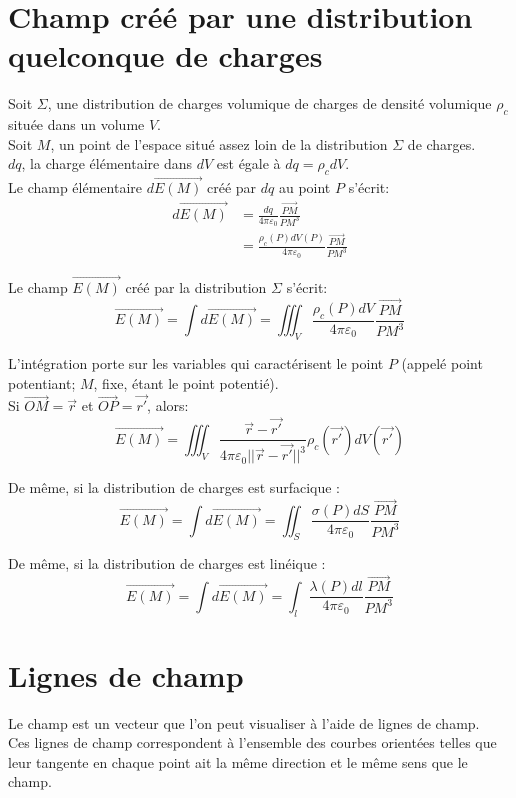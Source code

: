 \documentclass[../main.tex]{subfile}
\begin{document}
\section{Champ créé par une distribution quelconque de charges}
Soit $\Sigma$, une distribution de charges volumique de charges de densité volumique $\rho_c$ située dans un volume $V$.\\
Soit $M$, un point de l'espace situé assez loin de la distribution $\Sigma$ de charges.\\
$dq$, la charge élémentaire dans $dV$ est égale à $dq = \rho_cdV$.\\
Le champ élémentaire $d\vec{E(M)}$ créé par $dq$ au point $P$ s'écrit:
$$
\begin{aligned}
	d\vec{E(M)} &= \frac{dq}{4\pi\varepsilon_0} \frac{\vec{PM}}{PM^3}\\
	&= \frac{\rho_c(P) dV(P)}{4\pi\varepsilon_0}\frac{\vec{PM}}{PM^3}
\end{aligned}
$$

Le champ $\vec{E(M)}$ créé par la distribution $\Sigma$ s'écrit:
$$\vec{E(M)} = \int d\vec{E(M)} = \iiint_V \frac{\rho_c(P)dV}{4\pi\varepsilon_0} \frac{\vec{PM}}{PM^3}$$

L'intégration porte sur les variables qui caractérisent le point $P$ (appelé point potentiant; $M$, fixe, étant le point potentié).\\
Si $\vec{OM} = \vec{r}$ et $\vec{OP} = \vec{r'}$, alors:
$$\vec{E(M)} = \iiint_V \frac{\vec{r} - \vec{r'}}{4\pi\varepsilon_0 ||\vec{r} - \vec{r'}||^3} \rho_c(\vec{r'}) dV(\vec{r'})$$

De même, si la distribution de charges est surfacique : 
$$\vec{E(M)} = \int d\vec{E(M)} = \iint_S \frac{\sigma(P) dS}{4\pi\varepsilon_0} \frac{\vec{PM}}{PM^3}$$

De même, si la distribution de charges est linéique : 
$$\vec{E(M)} = \int d\vec{E(M)} = \int_l \frac{\lambda(P) dl}{4\pi\varepsilon_0} \frac{\vec{PM}}{PM^3}$$

\section{Lignes de champ}
Le champ est un vecteur que l'on peut visualiser à l'aide de lignes de champ.\\
Ces lignes de champ correspondent à l'ensemble des courbes orientées telles que leur tangente en chaque point ait la même direction et le même sens que le champ.


\end{document}
